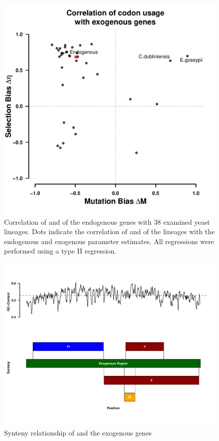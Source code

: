 \documentclass[12pt]{article}
\begin{document}
\begin{figure}[H]
     \centering
	\includegraphics[width=\textwidth]{img/csp_mean_correlation_exo.pdf}
	\caption{Correlation of \DM and \DE of the endogenous genes with 38 examined yeast lineages. Dots indicate the correlation of \DM and \DE of the lineages with the endogenous and exogenous parameter estimates. All regressions were performed using a type II regression.}
	\label{fig:csp_endo_comp}
\end{figure}


\begin{figure}[H]
     \centering
	\includegraphics[width=\textwidth]{img/synteny_blocks_and_gc.pdf}
	\caption{Synteny relationship of \gossypii and the exogenous genes}
	\label{fig:synt_rel}
\end{figure}
\end{document}
